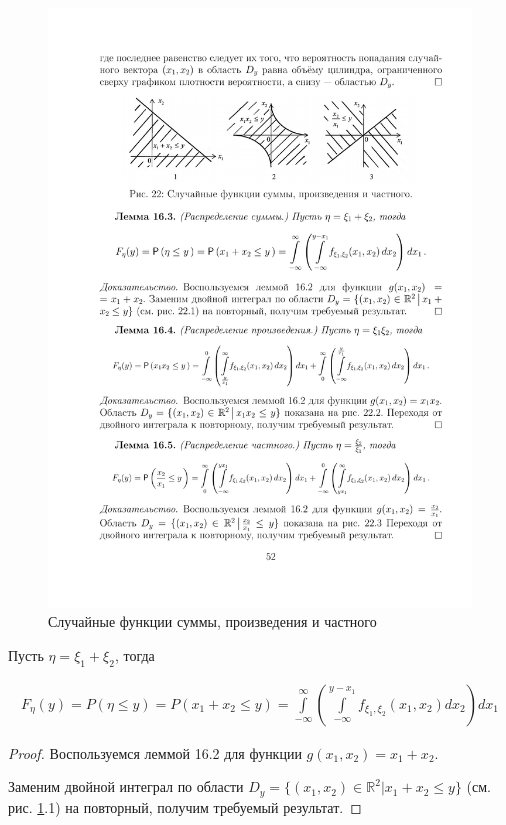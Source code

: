 \begin{figure}[h!]
	\centering
	\includegraphics[]{pic/pic22}
	\caption{Случайные функции суммы, произведения и частного}
	\label{fig22}
\end{figure}

\begin{lemma}
Пусть $\eta = \xi_1 + \xi_2$, тогда

\begin{gather*}
	F_\eta (y) = P ( \eta \leq y ) = P(x_1+x_2 \leq y )=
	\int\limits_{-\infty}^{\infty}\left(
		\int\limits_{-\infty}^{y-x_1 } f_{\xi_1,\xi_2} (x_1 , x_2 ) dx_2
	\right)dx_1
\end{gather*}
\end{lemma}
\begin{proof}
Воспользуемся леммой 16.2 для функции $g(x_1 , x_2 )=x_1 + x_2$. 

Заменим двойной интеграл по области $D_y = \{(x_1 , x_2 ) \in \mathbb{R}^2 | x_1 +
x_2 \leq y\}$ (см. рис. \ref{fig22}.1) на повторный, получим требуемый результат.	
\end{proof}

